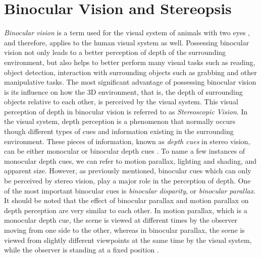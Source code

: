 \chapter{Binocular Vision and Stereopsis}
\label{chap:BinocularVision}

\textit{Binocular vision} is a term used for the visual system of animals with two eyes \cite{how95}, and therefore, applies to the human visual system as well. 
Possessing binocular vision not only leads to a better perception of depth
of the surrounding environment, but also helps to better perform many visual tasks such as reading, object detection, interaction with surrounding objects such as grabbing and other manipulative 
tasks. The most significant advantage of possessing binocular vision is its influence on how the 3D environment, that is, the 
depth of surrounding objects relative to each other, 
is perceived by the visual system. This visual perception of depth in binocular vision is referred to as {\it Stereoscopic Vision}.
In the visual system, depth perception is a phenomenon that normally occurs though different types of cues and information existing in the surrounding environment. 
These pieces of information, known as {\it depth cues} in stereo vision, can be either monocular or binocular depth cues \cite{how95}.
To name a few instances of monocular depth cues, we can refer to motion parallax, lighting and shading, and apparent size. 
However, as previously mentioned, binocular cues which can only be perceived
by stereo vision, play a major role in the perception of depth. One of the most important binocular cues is {\it binocular disparity}, or {\it binocular parallax}. 
It should be noted that the effect of binocular parallax and motion parallax on depth perception are very similar to each other. 
In motion parallax, which is a monocular depth cue, the scene is viewed at different times by the observer moving from one side to the other, 
whereas in binocular parallax, the scene is viewed from slightly different viewpoints at
the same time by the visual system, while the observer is standing at a fixed position \cite{how95}.

